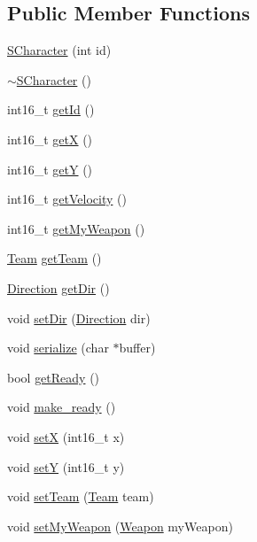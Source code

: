 \subsection*{Public Member Functions}
\begin{DoxyCompactItemize}
\item 
\hyperlink{class_s_character_aaa56aee926cdedadae1db5335f047cd1}{S\+Character} (int id)
\item 
\hyperlink{class_s_character_aafb443599efbd749337eb0190fc5eabe}{$\sim$\+S\+Character} ()
\item 
int16\+\_\+t \hyperlink{class_s_character_aed3654ba330a24ac0990047e56bccd32}{get\+Id} ()
\item 
int16\+\_\+t \hyperlink{class_s_character_a023df9332c559507d8986facbb37dcad}{get\+X} ()
\item 
int16\+\_\+t \hyperlink{class_s_character_acbdd136e3a70a94f2f08c7158f042de6}{get\+Y} ()
\item 
int16\+\_\+t \hyperlink{class_s_character_af36a0d74ed25de0dc9e29213b46f7928}{get\+Velocity} ()
\item 
int16\+\_\+t \hyperlink{class_s_character_ab1ffdf2103c6277f1ff34c7b48920320}{get\+My\+Weapon} ()
\item 
\hyperlink{_enums_8hpp_a9c13bb5b1d69698f9b47900990eaa598}{Team} \hyperlink{class_s_character_a4384f9f73da73ddb603d4d85fdae00d7}{get\+Team} ()
\item 
\hyperlink{_enums_8hpp_a224b9163917ac32fc95a60d8c1eec3aa}{Direction} \hyperlink{class_s_character_a4c4daa4601c62ada0af0dccef8680c60}{get\+Dir} ()
\item 
void \hyperlink{class_s_character_a435234e99c79e6094daa3c554033d4ae}{set\+Dir} (\hyperlink{_enums_8hpp_a224b9163917ac32fc95a60d8c1eec3aa}{Direction} dir)
\item 
void \hyperlink{class_s_character_ab99fa7f23b8c7c9ca45d78d5e9bb8742}{serialize} (char $\ast$buffer)
\item 
bool \hyperlink{class_s_character_a84075df93e0ad219264a349a247b6986}{get\+Ready} ()
\item 
void \hyperlink{class_s_character_a4537343129f515509139a762f4d04390}{make\+\_\+ready} ()
\item 
void \hyperlink{class_s_character_a410a1a3d599fc8e91252805ce4c50f10}{set\+X} (int16\+\_\+t x)
\item 
void \hyperlink{class_s_character_a7034f78acd75a886ecd02912b20ddcde}{set\+Y} (int16\+\_\+t y)
\item 
void \hyperlink{class_s_character_a50249c9fdf9c98080fce5d9ff0e944ca}{set\+Team} (\hyperlink{_enums_8hpp_a9c13bb5b1d69698f9b47900990eaa598}{Team} team)
\item 
void \hyperlink{class_s_character_a91f39c3163ed5bbadf6d49c6b69d52f6}{set\+My\+Weapon} (\hyperlink{_enums_8hpp_ad9700e9db9d62004af4a04e4e13912c5}{Weapon} my\+Weapon)
\end{DoxyCompactItemize}


